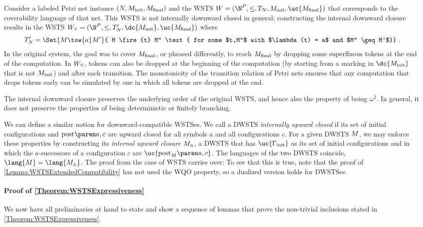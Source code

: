 \documentclass[../../diss.tex]{subfiles}
\begin{document}
\begin{example}
    Consider a labeled Petri net instance $(N,M_{\text{init}},M_{\text{final}})$ and the WSTS $\wsts = (\N^P,\leq,T_N,\Minit,\uc{\Mfinal})$ that corresponds to the coverability language of that net.
    This WSTS is not internally downward closed in general; constructing the internal downward closure results in the WSTS $\idc{\wsts} = (\N^P,\leq,T_N',\dc{\Minit},\uc{\Mfinal})$
    where
    \[
        T_N' = \Set{ M \tow{a} M'}{ M \fire{t} M'' \text{ for some $t,M''$ with $\lambda(t) = a$ and $M'' \geq M'$}}
        \ .
    \]
    In the original system, the goal was to cover $M_{\text{final}}$, or phrased differently, to reach $M_{\text{final}}$ by dropping some superfluous tokens at the end of the computation.
    In $W_{\scriptstyle{\triangledown}}$, tokens can also be dropped at the beginning of the computation (by starting from a marking in $\dc{\Minit}$ that is not $M_{\text{init}}$) and after each transition.
    The monotonicity of the transition relation of Petri nets ensures that any computation that drops tokens early can be simulated by one in which all tokens are dropped at the end.
\end{example}

The internal downward closure preserves the underlying order of the original WSTS, and hence also the property of being $\omega^2$.
In general, it does not preserve the properties of being deterministic or finitely branching.

We can define a similar notion for downward-compatible WSTSes.
We call a DWSTS \emph{internally upward closed} if its set of initial configurations and $\post{}{a}{c}$ are upward closed for all symbols $a$ and all configurations $c$.
For a given DWSTS $M$, we may enforce these properties by constructing its \emph{internal upward closure} $M_{\scriptstyle{\vartriangle}}$, a DWSTS that has $\uc{\configs_\init}$ as its set of initial configurations and in which the $a$-successors of a configuration $c$ are $\uc{\post{\dwsts}{a}{c}}$.
The languages of the two DWSTS coincide, $\lang{\dwsts} = \lang{\iuc{\dwsts}}$.
The proof from the case of WSTS carries over:
To see that this is true, note that the proof of \cref{Lemma:WSTSExtendedCompatibility} has not used the WQO property, so a dualized version holds for DWSTSes.

\paragraph{Proof of \cref{Theorem:WSTSExpressiveness}}

We now have all preliminaries at hand to state and show a sequence of lemmas that prove the non-trivial inclusions stated in \cref{Theorem:WSTSExpressiveness}.
\end{document}
